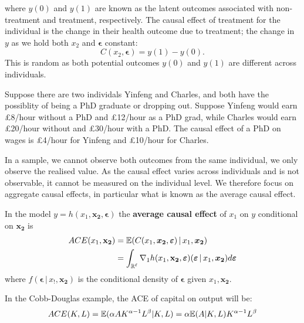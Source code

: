 \documentclass[DIV=14,titlepage=false]{scrreprt}
\begin{document}
where \( y(0) \) and \( y(1) \) are known as the latent outcomes associated with non-treatment and treatment, respectively. The causal effect of treatment for the individual is the change in their health outcome due to treatment; the change in \( y \) as we hold both \( x_2 \) and \( \boldsymbol{\epsilon} \) constant:
\[
C(x_2, \boldsymbol{\epsilon}) = y(1) - y(0).
\]
This is random as both potential outcomes \( y(0) \) and \( y(1) \) are different across individuals. 

\begin{example}
    Suppose there are two individals Yinfeng and Charles, and both have the possiblity of being a PhD graduate or dropping out. Suppose Yinfeng would earn £8/hour without a PhD and £12/hour as a PhD grad, while Charles would earn £20/hour without and £30/hour with a PhD. The causal effect of a PhD on wages is £4/hour for Yinfeng and £10/hour for Charles.
\end{example}

In a sample, we cannot observe both outcomes from the same individual, we only observe the realised value. As the causal effect varies across individuals and is not observable, it cannot be measured on the individual level. We therefore focus on aggregate causal effects, in particular what is known as the average causal effect.

\begin{definition}
    In the model $y = h(x_1, \mathbf{x_2},\boldsymbol{\epsilon})$ the \textbf{average causal effect} of $x_1$ on $y$ conditional on $\mathbf{x_2}$ is 
    \begin{align*}
        ACE(x_1, \mathbf{x_2}) &= \mathbb{E}(C(x_1, \boldsymbol{x_2}, \boldsymbol{\varepsilon}) \, | \, x_1, \boldsymbol{x_2}) \\
       &= \int_{\mathbb{R}^{\ell}} \nabla_1 h(x_1, \mathbf{x_2},\boldsymbol{\varepsilon}) (\boldsymbol{\varepsilon} \, | \,x_1, \boldsymbol{x_2}) d\boldsymbol{\varepsilon}    
    \end{align*}
        where $f(\boldsymbol{\epsilon} \, | \, x_!, \boldsymbol{x_2})$ is the conditional density of $\boldsymbol{\epsilon}$ given $x_1, \boldsymbol{x_2}$.
\end{definition}

\begin{example}

In the Cobb-Douglas example, the ACE of capital on output will be:
\[ ACE(K,L)=\mathbb{E}(\alpha AK^{\alpha-1}L^{\beta}|K,L)=\alpha \mathbb{E}(A|K,L)K^{\alpha -1}L^{\beta} \]

\end{example}
\end{document}
